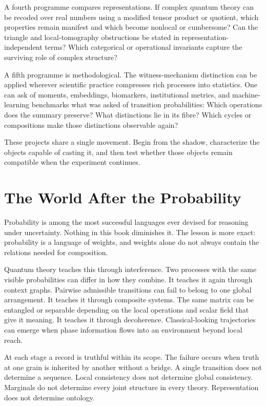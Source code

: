 \documentclass[12pt,openany]{book}
\begin{document}
A fourth programme compares representations. If complex quantum theory can be recoded over real numbers using a modified tensor product or quotient, which properties remain manifest and which become nonlocal or cumbersome? Can the triangle and local-tomography obstructions be stated in representation-independent terms? Which categorical or operational invariants capture the surviving role of complex structure?

A fifth programme is methodological. The witness-mechanism distinction can be applied wherever scientific practice compresses rich processes into statistics. One can ask of moments, embeddings, biomarkers, institutional metrics, and machine-learning benchmarks what was asked of transition probabilities: Which operations does the summary preserve? What distinctions lie in its fibre? Which cycles or compositions make those distinctions observable again?

These projects share a single movement. Begin from the shadow, characterize the objects capable of casting it, and then test whether those objects remain compatible when the experiment continues.

\chapter{The World After the Probability}
Probability is among the most successful languages ever devised for reasoning under uncertainty. Nothing in this book diminishes it. The lesson is more exact: probability is a language of weights, and weights alone do not always contain the relations needed for composition.

Quantum theory teaches this through interference. Two processes with the same visible probabilities can differ in how they combine. It teaches it again through context graphs. Pairwise admissible transitions can fail to belong to one global arrangement. It teaches it through composite systems. The same matrix can be entangled or separable depending on the local operations and scalar field that give it meaning. It teaches it through decoherence. Classical-looking trajectories can emerge when phase information flows into an environment beyond local reach.

At each stage a record is truthful within its scope. The failure occurs when truth at one grain is inherited by another without a bridge. A single transition does not determine a sequence. Local consistency does not determine global consistency. Marginals do not determine every joint structure in every theory. Representation does not determine ontology.
\end{document}
